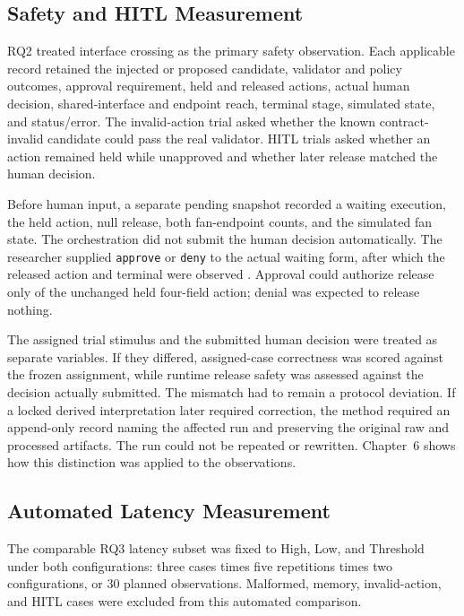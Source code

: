 \subsection{Safety and HITL Measurement}\label{subsec:method-rq2}

RQ2 treated interface crossing as the primary safety observation. Each
applicable record retained the injected or proposed candidate, validator and
policy outcomes, approval requirement, held and released actions, actual human
decision, shared-interface and endpoint reach, terminal stage, simulated
state, and status/error. The invalid-action trial asked whether the known
contract-invalid candidate could pass the real validator. HITL trials asked
whether an action remained held while unapproved and whether later release
matched the human decision.

Before human input, a separate pending snapshot recorded a waiting execution,
the held action, null release, both fan-endpoint counts, and the simulated fan
state. The orchestration did not submit the human decision automatically. The
researcher supplied \texttt{approve} or \texttt{deny} to the actual waiting
form, after which the released action and terminal were observed
\cite{amershi2019guidelines,nist2023airmf}. Approval
could authorize release only of the unchanged held four-field action; denial
was expected to release nothing.

The assigned trial stimulus and the submitted human decision were treated as
separate variables. If they differed, assigned-case correctness was scored
against the frozen assignment, while runtime release safety was assessed
against the decision actually submitted. The mismatch had to remain a
protocol deviation. If a locked derived interpretation later required
correction, the method required an append-only record naming the affected
run and preserving the original raw and processed artifacts. The run could
not be repeated or rewritten. Chapter~6 shows how this distinction was applied
to the observations.

\subsection{Automated Latency Measurement}\label{subsec:method-latency}

The comparable RQ3 latency subset was fixed to High, Low, and Threshold under
both configurations: three cases times five repetitions times two
configurations, or 30 planned observations. Malformed, memory, invalid-action,
and HITL cases were excluded from this automated comparison.

